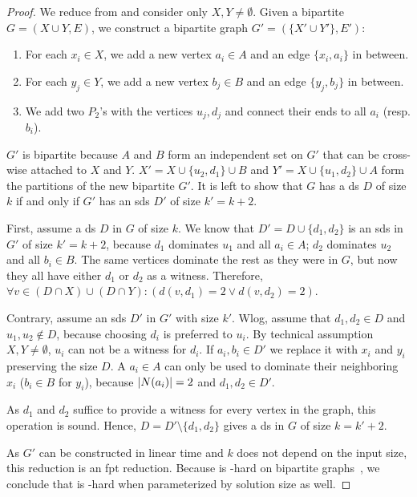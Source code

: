 \begin{proof}
    We reduce from \dom and consider only $X, Y \neq \emptyset$.
    Given a bipartite $G = ( X \cup Y, E)$, we construct a bipartite graph $G' = (\{X' \cup Y'\},E')$:
    \begin{enumerate}[topsep=0pt,itemsep=0ex,partopsep=1ex,parsep=1ex]
        \item For each $x_i \in X$, we add a new vertex $a_i \in A$  and an edge $\{x_i, a_i\}$ in between. 
        \item For each $y_j \in Y$, we add a new vertex $b_j \in B$ and an edge $\{y_j, b_j\}$ in between.
        \item We add two $P_2$'s with the vertices $u_j,d_j$ and connect their ends to all $a_i$ (resp. $b_i$).
    \end{enumerate}

    $G'$ is bipartite because $A$ and $B$ form an independent set on $G'$ that can be cross-wise attached to $X$ and $Y$. 
    $X' = X \cup \{u_2,d_1\} \cup B$ and $Y' = X \cup \{u_1,d_2\} \cup A$ form the partitions of the new bipartite $G'$.
    It is left to show that $G$ has a ds $D$ of size $k$ if and only if $G'$ has an sds $D'$ of size $k' = k + 2$.
 
    First, assume a ds $D$ in $G$ of size $k$. 
    We know that $D' = D\cup \{d_1,d_2\}$ is an sds in $G'$ of size $k' = k + 2$, because $d_1$ dominates $u_1$ and all $a_i \in A$; $d_2$ dominates $u_2$ and all $b_i \in B$. 
    The same vertices dominate the rest as they were in $G$, but now they all have either $d_1$ or $d_2$ as a witness.
    Therefore,  $\forall v \in (D \cap X) \cup (D \cap Y): (d(v, d_1) = 2 \vee d(v, d_2)=2)$.

    Contrary, assume an sds $D'$ in $G'$ with size $k'$. 
    Wlog, assume that $d_1, d_2 \in D$ and $u_1,u_2 \notin D$, because choosing $d_i$ is preferred to $u_i$.
    By technical assumption $X, Y \neq \emptyset$, $u_i$ can not be a witness for $d_i$.
    If $a_i,b_i \in D'$ we replace it with $x_i$ and $y_i$ preserving the size $D$.
    A $a_i \in A$ can only be used to dominate their neighboring $x_i$ ($b_i \in B$ for $y_i$), because $\abs{N(a_i)} = 2$ and $d_1,d_2\in D'$.

    As $d_1$ and $d_2$ suffice to provide a witness for every vertex in the graph, this operation is sound.
    Hence, $D = D' \setminus \{ d_1,d_2\}$ gives a ds in $G$ of size $ k = k' + 2$.

    As $G'$ can be constructed in linear time and $k$ does not depend on the input size, this reduction is an fpt reduction.  
    Because \dom is \WTWOhs-hard on bipartite graphs~\cite[Th. 1]{Raman2008}, we conclude that \sdom is \WTWOhs-hard when parameterized by solution size as well.
\end{proof}

